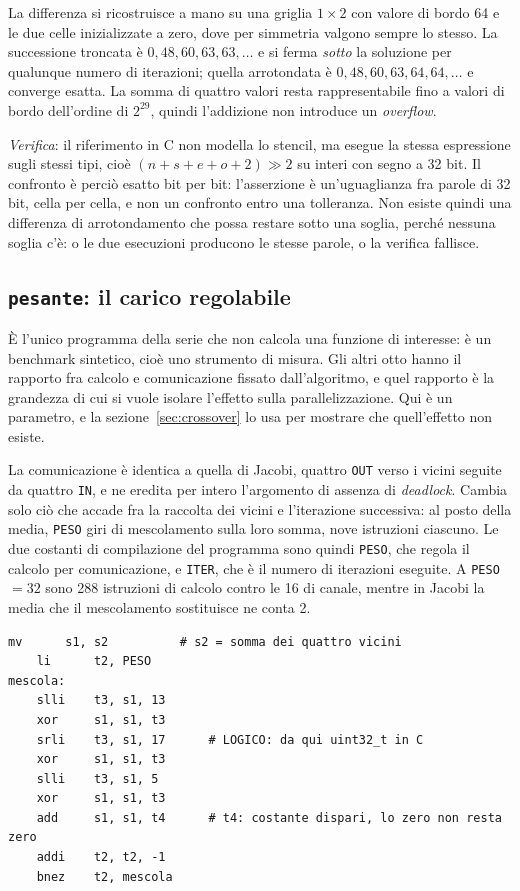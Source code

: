 La differenza si ricostruisce a mano su una griglia $1\times2$ con valore di
bordo 64 e le due celle inizializzate a zero, dove per simmetria valgono sempre
lo stesso. La successione troncata è $0, 48, 60, 63, 63, \dots$ e si ferma
\emph{sotto} la soluzione per qualunque numero di iterazioni; quella arrotondata
è $0, 48, 60, 63, 64, 64, \dots$ e converge esatta. La somma di quattro valori
resta rappresentabile fino a valori di bordo dell'ordine di $2^{29}$, quindi
l'addizione non introduce un \emph{overflow}.

\emph{Verifica}: il riferimento in C non modella lo stencil, ma esegue la stessa
espressione sugli stessi tipi, cioè $(n + s + e + o + 2) \gg 2$ su interi con
segno a 32 bit. Il confronto è perciò esatto bit per bit: l'asserzione è un'uguaglianza
fra parole di 32 bit, cella per cella, e non un confronto entro una
tolleranza. Non esiste quindi una differenza di arrotondamento che possa
restare sotto una soglia, perché nessuna soglia c'è: o le due esecuzioni
producono le stesse parole, o la verifica fallisce.

\subsection{\texttt{pesante}: il carico regolabile}
\label{sec:kernel-pesante}

È l'unico programma della serie che non calcola una funzione di interesse: è un
benchmark sintetico, cioè uno strumento di misura. Gli altri otto hanno il rapporto fra
calcolo e comunicazione fissato dall'algoritmo, e quel rapporto è la grandezza
di cui si vuole isolare l'effetto sulla parallelizzazione. Qui è un parametro,
e la sezione~\ref{sec:crossover} lo usa per mostrare che quell'effetto non
esiste.

La comunicazione è identica a quella di Jacobi, quattro \texttt{OUT} verso i
vicini seguite da quattro \texttt{IN}, e ne eredita per intero l'argomento di
assenza di \emph{deadlock}. Cambia solo ciò che accade fra la raccolta dei vicini e
l'iterazione successiva: al posto della media, \texttt{PESO} giri di
mescolamento sulla loro somma, nove istruzioni ciascuno. Le due costanti di
compilazione del programma sono quindi \texttt{PESO}, che regola il calcolo per
comunicazione, e \texttt{ITER}, che è il numero di iterazioni eseguite. A \texttt{PESO} $= 32$
sono 288 istruzioni di calcolo contro le 16 di canale, mentre in Jacobi la
media che il mescolamento sostituisce ne conta 2.

\begin{lstlisting}[caption={Il ciclo di mescolamento di \texttt{pesante.s}, ripetuto \texttt{PESO} volte},label={lst:pesante},language=RISCV,float=htbp]
    mv      s1, s2          # s2 = somma dei quattro vicini
    li      t2, PESO
mescola:
    slli    t3, s1, 13
    xor     s1, s1, t3
    srli    t3, s1, 17      # LOGICO: da qui uint32_t in C
    xor     s1, s1, t3
    slli    t3, s1, 5
    xor     s1, s1, t3
    add     s1, s1, t4      # t4: costante dispari, lo zero non resta zero
    addi    t2, t2, -1
    bnez    t2, mescola
\end{lstlisting}

